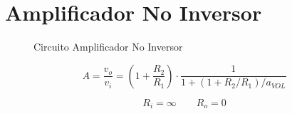 \chapter{Amplificador No Inversor}

\begin{figure}[ht]
	\begin{center}
		
	\caption{Circuito Amplificador No Inversor}
	\label{fig:ninv}
	\end{center}
\end{figure}

\begin{equation}
A = \frac{v_o}{v_i} = \left(1+\frac{R_2}{R_1}\right) \cdot \frac{1}{1+(1+R_2/R_1)/a_{VOL}}
\end{equation}

\begin{equation}
R_i=\infty \qquad R_o=0
\end{equation}